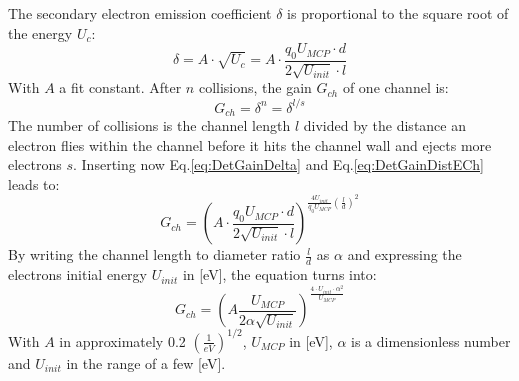 		The secondary electron emission coefficient $\delta$ is proportional to the square root of the energy $U_c$:
		\begin{equation}
			\delta = A\cdot \sqrt{U_c} = A\cdot \frac{q_0 U_{MCP}\cdot d}{2 \sqrt{U_{init}}\cdot l}
			\label{eq:DetGainDelta}
		\end{equation}
		With $A$ a fit constant. After $n$ collisions, the gain $G_{ch}$ of one channel is:
		\begin{equation}
			G_{ch} = \delta^{n} = \delta^{l/s}
			\label{eq:detGainDel}
		\end{equation}
		The number of collisions is the channel length $l$ divided by the distance an electron flies within the channel before it hits the channel wall and ejects more electrons $s$. Inserting now Eq.\eqref{eq:DetGainDelta} and Eq.\eqref{eq:DetGainDistECh} leads to:
		\begin{equation}
			G_{ch} = \left(A\cdot\frac{q_0 U_{MCP} \cdot d}{2\sqrt{U_{init}}\cdot l}\right)^{\frac{4U_{init}}{q_0 U_{MCP}}\left(\frac{l}{d}\right)^2}
		\end{equation}
		By writing the channel length to diameter ratio $\frac{l}{d}$ as $\alpha$ and expressing the electrons initial energy $U_{init}$ in [eV], the equation turns into:
		\begin{equation}
			G_{ch} = \left(A\frac{U_{MCP}}{2\alpha\sqrt{U_{init}}}\right)^{\frac{4\cdot U_{init}\cdot\alpha^2}{U_{MCP}}}
		\end{equation}
		With $A$ in approximately 0.2 $\left(\frac{1}{eV}\right)^{1/2}$, %
		$U_{MCP}$ in [eV], $\alpha$ is a dimensionless number and $U_{init}$ in the range of a few [eV].

		
		
		
